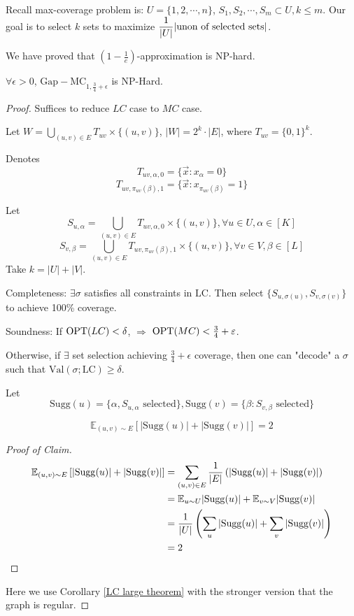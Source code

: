 

    Recall max-coverage problem is:  $ U=\{1,2,\cdots,n\} $,  $ S_1,S_2,\cdots,S_m\subset U,k \leq m $. Our goal is to select  $ k  $ sets to maximize  $ \displaystyle\frac{1}{|U|}|\text{unon of selected sets}| $.
    
    We have proved that  $ (1-\frac{1}{e}) $-approximation is NP-hard.
    
\begin{theorem}
    $ \forall \epsilon>0 $,  $ \mathrm{Gap-MC}_{1,\frac{3}{4}+\epsilon} $ is NP-Hard.
\end{theorem}
\begin{proof}
    Suffices to reduce  $ LC $ case to  $ MC $ case.
    
    Let  $ W=\bigcup_{(u,v)\in E}T_{uv}\times\{(u,v)\} $,  $ |W|=2^k\cdot|E| $, where  $ T_{uv}=\{0,1\}^k $.
    
    Denotes 
    \[T_{uv,\alpha,0}=\{\vec{x}:x_\alpha=0\}\]
    \[T_{uv,\pi_{uv}(\beta),1}=\{\vec{x}:x_{\pi_{uv}(\beta)}=1\}\]


    Let  \[S_{u,\alpha}=\bigcup_{(u,v)\in E} T_{uv,\alpha,0}\times\{(u,v)\},\forall u\in U,\alpha\in [K] \]
    \[S_{v,\beta}=\bigcup_{(u,v)\in E}T_{uv,\pi_{uv}(\beta),1}\times\{(u,v)\},\forall v\in V,\beta\in [L]\]
    Take  $ k=|U|+|V| $.

    Completeness: $ \exists\sigma $ satisfies all constraints in  $ \mathrm{LC} $. Then select  $ \{S_{u,\sigma(u)},S_{v,\sigma(v)}\} $ to achieve 100\% coverage.
    
    Soundness: If  $ \mathrm{OPT}(LC)<\delta $,  $ \Rightarrow $  $ \mathrm{OPT}(MC)<\frac{3}{4}+\varepsilon $.
    
    Otherwise, if  $ \exists $ set selection achieving  $ \frac{3}{4}+\epsilon $ coverage, then one can "decode" a  $ \sigma  $ such that   $ \mathrm{Val}(\sigma;\mathrm{LC}) \geq \delta $.

    Let 
    \[\mathrm{Sugg}(u)=\{\alpha,S_{u,\alpha}\text{ selected}\},\mathrm{Sugg}(v)=\{\beta:S_{v,\beta}\text{ selected}\}\]

    \begin{claim}
        \[\mathbb{E}_{(u,v)\sim E}\left[|\mathrm{Sugg}(u)|+|\mathrm{Sugg}(v)|\right]=2\]
    \end{claim}
    \begin{proof}[Proof of Claim]
        \begin{align*}
            \mathbb{E}_{(u,v)\sim E}\left[|\mathrm{Sugg}(u)|+|\mathrm{Sugg}(v)|\right] &= \sum_{(u,v)\in E}\frac{1}{|E|}\left(|\mathrm{Sugg}(u)|+|\mathrm{Sugg}(v)|\right)\\
            &= \mathbb E_{u\sim U}|\mathrm{Sugg}(u)|+\mathbb E_{v\sim V}|\mathrm{Sugg}(v)|\\
            &=\frac{1}{|U|}\left(\sum_u|\mathrm{Sugg}(u)|+\sum_v|\mathrm{Sugg}(v)|\right)\\
            &=2
        \end{align*}
    \end{proof}
    Here we use Corollary \ref{LC large theorem} with the stronger version that the graph is regular.


\end{proof}

